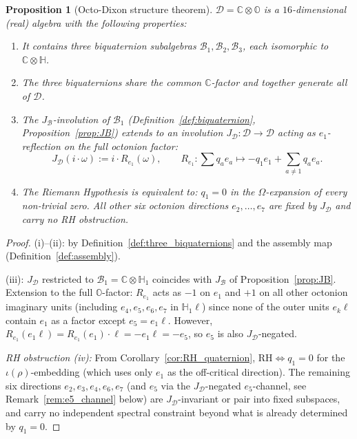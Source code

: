 \documentclass[12pt,a4paper]{article}
\newtheorem{proposition}[theorem]{Proposition}
\theoremstyle{remark}
\begin{document}
\begin{proposition}[Octo-Dixon structure theorem]\label{prop:octo_dixon}
$\mathcal{D}=\mathbb{C}\otimes\mathbb{O}$ is a $16$-dimensional (real)
algebra with the following properties:
\begin{enumerate}[label=(\roman*),leftmargin=*]
\item It contains three biquaternion subalgebras
  $\mathcal{B}_1,\mathcal{B}_2,\mathcal{B}_3$, each isomorphic to
  $\mathbb{C}\otimes\mathbb{H}$.
\item The three biquaternions share the common $\mathbb{C}$-factor and
  together generate all of $\mathcal{D}$.
\item The $J_{\mathcal{B}}$-involution of $\mathcal{B}_1$
  (Definition~\ref{def:biquaternion}, Proposition~\ref{prop:JB})
  extends to an involution
  $J_{\mathcal{D}}:\mathcal{D}\to\mathcal{D}$ acting as $e_1$-reflection
  on the full octonion factor:
  \[
    J_{\mathcal{D}}(i\cdot\omega) := i\cdot R_{e_1}(\omega),
    \qquad
    R_{e_1}:\sum q_a e_a \mapsto -q_1 e_1+\sum_{a\neq1}q_a e_a.
  \]
\item The Riemann Hypothesis is equivalent to:
  $q_1=0$ in the $\Omega$-expansion of every non-trivial zero.
  All other six octonion directions $e_2,\ldots,e_7$ are fixed by
  $J_{\mathcal{D}}$ and carry no RH obstruction.
\end{enumerate}
\end{proposition}
\begin{proof}
(i)--(ii): by Definition~\ref{def:three_biquaternions}
and the assembly map (Definition~\ref{def:assembly}).

(iii): $J_{\mathcal{D}}$ restricted to $\mathcal{B}_1=\mathbb{C}\otimes\mathbb{H}_1$
coincides with $J_{\mathcal{B}}$ of Proposition~\ref{prop:JB}.
Extension to the full $\mathbb{O}$-factor: $R_{e_1}$ acts as $-1$
on $e_1$ and $+1$ on all other octonion imaginary units
(including $e_4,e_5,e_6,e_7$ in $\mathbb{H}_1\ell$)
since none of the outer units $e_k\ell$ contain $e_1$ as a factor
except $e_5=e_1\ell$. However, $R_{e_1}(e_1\ell)=R_{e_1}(e_1)\cdot\ell=-e_1\ell=-e_5$,
so $e_5$ is also $J_{\mathcal{D}}$-negated.

\emph{RH obstruction (iv):}
From Corollary~\ref{cor:RH_quaternion}, $\mathrm{RH}\Leftrightarrow q_1=0$
for the $\iota(\rho)$-embedding (which uses only $e_1$ as the
off-critical direction). The remaining six directions $e_2,e_3,e_4,e_6,e_7$
(and $e_5$ via the $J_{\mathcal{D}}$-negated $e_5$-channel,
see Remark~\ref{rem:e5_channel} below) are $J_{\mathcal{D}}$-invariant
or pair into fixed subspaces, and carry no independent spectral constraint
beyond what is already determined by $q_1=0$.
\end{proof}
\end{document}
